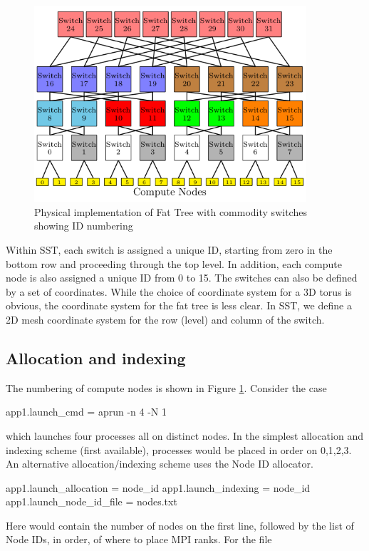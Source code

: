 \begin{figure}[h!]
\centering
\includegraphics[width=0.9\textwidth]{figures/tikz/fattree/fattree_ids.png}
\caption{Physical implementation of Fat Tree with commodity switches showing ID numbering}
\label{fig:topologies:fattreeids}
\end{figure}

Within SST, each switch is assigned a unique ID, starting from zero in the bottom row and proceeding through the top level.
In addition, each compute node is also assigned a unique ID from 0 to 15.
The switches can also be defined by a set of coordinates.
While the choice of coordinate system for a 3D torus is obvious, 
the coordinate system for the fat tree is less clear.
In SST, we define a 2D mesh coordinate system for the row (level) and column of the switch.


\subsection{Allocation and indexing}
The numbering of compute nodes is shown in Figure \ref{fig:topologies:fattreeids}.
Consider the case

\begin{ViFile}
app1.launch_cmd = aprun -n 4 -N 1
\end{ViFile}
which launches four processes all on distinct nodes.
In the simplest allocation and indexing scheme (first available),
processes would be placed in order on 0,1,2,3.
An alternative allocation/indexing scheme uses the Node ID allocator.

\begin{ViFile}
app1.launch_allocation = node_id
app1.launch_indexing = node_id
app1.launch_node_id_file = nodes.txt
\end{ViFile}
Here  would contain the number of nodes on the first line, followed by the list of Node IDs, in order, of where to place MPI ranks.
For the file


